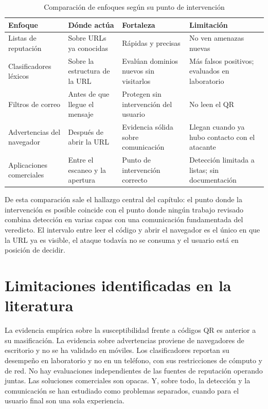 \begin{table}[H]
	\centering
	\caption{Comparación de enfoques según su punto de intervención}
	\label{tab:comparacion}
	\small
	\begin{tabular}{@{}>{\raggedright\arraybackslash}p{3.2cm}>{\raggedright\arraybackslash}p{3.3cm}>{\raggedright\arraybackslash}p{3.3cm}>{\raggedright\arraybackslash}p{3.3cm}@{}}
		\toprule
		\textbf{Enfoque} & \textbf{Dónde actúa} & \textbf{Fortaleza} & \textbf{Limitación} \\
		\midrule
		Listas de reputación \cite{google_safebrowsing,phishtank_devinfo,virustotal_apiv3} & Sobre URLs ya conocidas & Rápidas y precisas & No ven amenazas nuevas \\
		Clasificadores léxicos \cite{ma2009beyond,le2011phishdef} & Sobre la estructura de la URL & Evalúan dominios nuevos sin visitarlos & Más falsos positivos; evaluados en laboratorio \\
		Filtros de correo \cite{unit42_2023qr} & Antes de que llegue el mensaje & Protegen sin intervención del usuario & No leen el QR \\
		Advertencias del navegador \cite{egelman2008warned,akhawe2013alice} & Después de abrir la URL & Evidencia sólida sobre comunicación & Llegan cuando ya hubo contacto con el atacante \\
		Aplicaciones comerciales & Entre el escaneo y la apertura & Punto de intervención correcto & Detección limitada a listas; sin documentación \\
		\bottomrule
	\end{tabular}
\end{table}

De esta comparación sale el hallazgo central del capítulo: el punto donde la intervención es posible coincide con el punto donde ningún trabajo revisado combina detección en varias capas con una comunicación fundamentada del veredicto. El intervalo entre leer el código y abrir el navegador es el único en que la URL ya es visible, el ataque todavía no se consuma y el usuario está en posición de decidir.

\section{Limitaciones identificadas en la literatura}

La evidencia empírica sobre la susceptibilidad frente a códigos QR es anterior a su masificación. La evidencia sobre advertencias proviene de navegadores de escritorio y no se ha validado en móviles. Los clasificadores reportan su desempeño en laboratorio y no en un teléfono, con sus restricciones de cómputo y de red. No hay evaluaciones independientes de las fuentes de reputación operando juntas. Las soluciones comerciales son opacas. Y, sobre todo, la detección y la comunicación se han estudiado como problemas separados, cuando para el usuario final son una sola experiencia.

